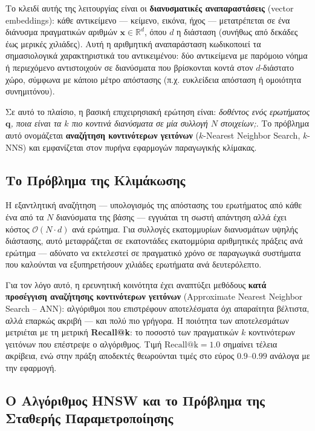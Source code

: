 \documentclass[12pt,a4paper]{article}
\begin{document}
Το κλειδί αυτής της λειτουργίας είναι οι \textbf{διανυσματικές αναπαραστάσεις} (vector embeddings): κάθε αντικείμενο --- κείμενο, εικόνα, ήχος --- μετατρέπεται σε ένα διάνυσμα πραγματικών αριθμών $\mathbf{x} \in \mathbb{R}^d$, όπου $d$ η διάσταση (συνήθως από δεκάδες έως μερικές χιλιάδες). Αυτή η αριθμητική αναπαράσταση κωδικοποιεί τα σημασιολογικά χαρακτηριστικά του αντικειμένου: δύο αντικείμενα με παρόμοιο νόημα ή περιεχόμενο αντιστοιχούν σε διανύσματα που βρίσκονται κοντά στον $d$-διάστατο χώρο, σύμφωνα με κάποιο μέτρο απόστασης (π.χ. ευκλείδεια απόσταση ή ομοιότητα συνημιτόνου).

Σε αυτό το πλαίσιο, η βασική επιχειρησιακή ερώτηση είναι: \textit{δοθέντος ενός ερωτήματος $\mathbf{q}$, ποια είναι τα $k$ πιο κοντινά διανύσματα σε μία συλλογή $N$ στοιχείων;}. Το πρόβλημα αυτό ονομάζεται \textbf{αναζήτηση κοντινότερων γειτόνων} ($k$-Nearest Neighbor Search, $k$-NNS) και εμφανίζεται στον πυρήνα εφαρμογών παραγωγικής κλίμακας.

\subsection{Το Πρόβλημα της Κλιμάκωσης}

Η εξαντλητική αναζήτηση --- υπολογισμός της απόστασης του ερωτήματος από κάθε ένα από τα $N$ διανύσματα της βάσης --- εγγυάται τη σωστή απάντηση αλλά έχει κόστος $\mathcal{O}(N \cdot d)$ ανά ερώτημα. Για συλλογές εκατομμυρίων διανυσμάτων υψηλής διάστασης, αυτό μεταφράζεται σε εκατοντάδες εκατομμύρια αριθμητικές πράξεις ανά ερώτημα --- αδύνατο να εκτελεστεί σε πραγματικό χρόνο σε παραγωγικά συστήματα που καλούνται να εξυπηρετήσουν χιλιάδες ερωτήματα ανά δευτερόλεπτο.

Για τον λόγο αυτό, η ερευνητική κοινότητα έχει αναπτύξει μεθόδους \textbf{κατά προσέγγιση αναζήτησης κοντινότερων γειτόνων} (Approximate Nearest Neighbor Search -- ANN): αλγόριθμοι που επιστρέφουν αποτελέσματα όχι απαραίτητα βέλτιστα, αλλά επαρκώς ακριβή --- και πολύ πιο γρήγορα. Η ποιότητα των αποτελεσμάτων μετριέται με τη μετρική \textbf{Recall@k}: το ποσοστό των πραγματικών $k$ κοντινότερων γειτόνων που επέστρεψε ο αλγόριθμος. Τιμή $\text{Recall@k} = 1.0$ σημαίνει τέλεια ακρίβεια, ενώ στην πράξη αποδεκτές θεωρούνται τιμές στο εύρος $0.9$--$0.99$ ανάλογα με την εφαρμογή.

\subsection{Ο Αλγόριθμος HNSW και το Πρόβλημα της Σταθερής Παραμετροποίησης}
\end{document}
